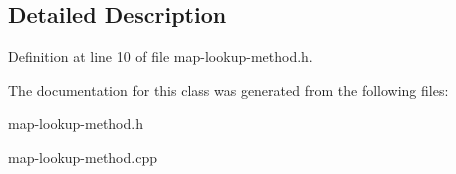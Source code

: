 \subsection{Detailed Description}


Definition at line 10 of file map-\/lookup-\/method.\+h.



The documentation for this class was generated from the following files\+:\begin{DoxyCompactItemize}
\item 
map-\/lookup-\/method.\+h\item 
map-\/lookup-\/method.\+cpp\end{DoxyCompactItemize}
